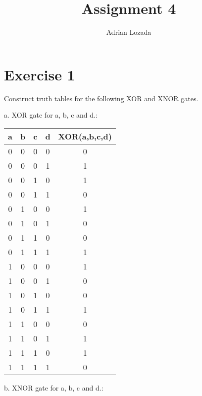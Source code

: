 \documentclass{article}
\author{Adrian Lozada}
\title{Assignment 4}
\begin{document}
    \maketitle
    \newpage
    \section{Exercise 1}
    \begin{flushleft}
        Construct truth tables for the following XOR and XNOR gates.
    \end{flushleft}
    \begin{flushleft}
        a. XOR gate for a, b, c and d.:
    \end{flushleft}
    \begin{center}
        \begin{tabular}{|c|c|c|c|c|}
            \hline
            a & b & c & d & XOR(a,b,c,d) \\
            \hline
            0 & 0 & 0 & 0 & 0 \\
            0 & 0 & 0 & 1 & 1 \\
            0 & 0 & 1 & 0 & 1 \\
            0 & 0 & 1 & 1 & 0 \\
            0 & 1 & 0 & 0 & 1 \\
            0 & 1 & 0 & 1 & 0 \\
            0 & 1 & 1 & 0 & 0 \\
            0 & 1 & 1 & 1 & 1 \\
            1 & 0 & 0 & 0 & 1 \\
            1 & 0 & 0 & 1 & 0 \\
            1 & 0 & 1 & 0 & 0 \\
            1 & 0 & 1 & 1 & 1 \\
            1 & 1 & 0 & 0 & 0 \\
            1 & 1 & 0 & 1 & 1 \\
            1 & 1 & 1 & 0 & 1 \\
            1 & 1 & 1 & 1 & 0 \\
            \hline
        \end{tabular}
    \end{center}
    \begin{flushleft}
        b. XNOR gate for a, b, c and d.:
    \end{flushleft}
\end{document}

